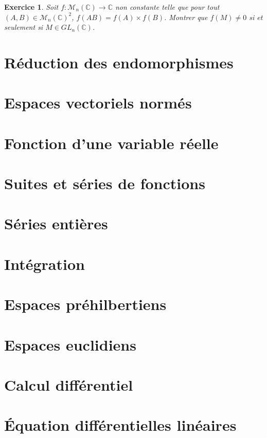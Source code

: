 \documentclass[12pt]{article}
\newtheorem{exercise}{Exercice}[section]
\theoremstyle{remark}
\theoremstyle{remark}
\newcommand{\C}{\mathbb{C}}
\newcommand{\M}{\mathcal{M}}
\begin{document}
\begin{exercise}
	Soit $f:\M_{n}(\C)\to\C$ non constante telle que pour tout $(A,B)\in\M_{n}(\C)^{2}$, $f(AB)=f(A)\times f(B)$. 
	Montrer que $f(M)\neq0$ si et seulement si $M\in GL_{n}(\C)$.
\end{exercise}

\cleardoublepage
\section{Réduction des endomorphismes}
\cleardoublepage
\section{Espaces vectoriels normés}
\cleardoublepage
\section{Fonction d'une variable réelle}
\cleardoublepage
\section{Suites et séries de fonctions}
\cleardoublepage
\section{Séries entières}
\cleardoublepage
\section{Intégration}
\cleardoublepage
\section{Espaces préhilbertiens}
\cleardoublepage
\section{Espaces euclidiens}
\cleardoublepage
\section{Calcul différentiel}
\cleardoublepage
\section{\'Equation différentielles linéaires}
\end{document}
